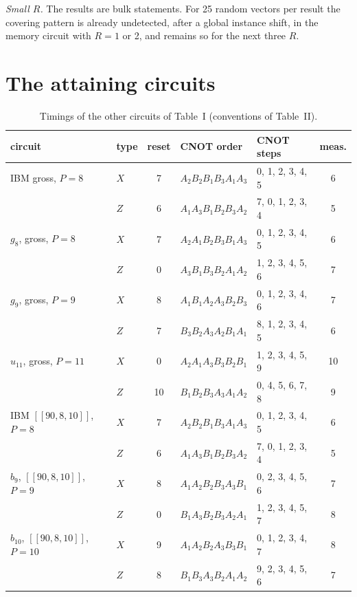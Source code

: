 \documentclass[aps,prl,twocolumn,superscriptaddress,nofootinbib]{revtex4-2}
\newcommand{\code}[1]{[[#1]]}
\begin{document}
\emph{Small $R$.} The results are bulk statements. For 25 random vectors per result the
covering pattern is already undetected, after a global instance shift, in the memory
circuit with $R=1$ or 2, and remains so for the next three $R$.

\section{The attaining circuits}\label{sm:attain}

\begin{table}[h]
\caption{Timings of the other circuits of Table~I (conventions of Table~II).}
\label{tab:timingS}
\begin{ruledtabular}
\begin{tabular}{llcllc}
circuit & type & reset & CNOT order & CNOT steps & meas.\\
\hline
IBM gross, $P=8$ & $X$ & 7 & $A_2B_2B_1B_3A_1A_3$ & 0, 1, 2, 3, 4, 5 & 6\\
 & $Z$ & 6 & $A_1A_3B_1B_2B_3A_2$ & 7, 0, 1, 2, 3, 4 & 5\\
$g_8$, gross, $P=8$ & $X$ & 7 & $A_2A_1B_2B_3B_1A_3$ & 0, 1, 2, 3, 4, 5 & 6\\
 & $Z$ & 0 & $A_3B_1B_3B_2A_1A_2$ & 1, 2, 3, 4, 5, 6 & 7\\
$g_9$, gross, $P=9$ & $X$ & 8 & $A_1B_1A_2A_3B_2B_3$ & 0, 1, 2, 3, 4, 6 & 7\\
 & $Z$ & 7 & $B_3B_2A_3A_2B_1A_1$ & 8, 1, 2, 3, 4, 5 & 6\\
$u_{11}$, gross, $P=11$ & $X$ & 0 & $A_2A_1A_3B_3B_2B_1$ & 1, 2, 3, 4, 5, 9 & 10\\
 & $Z$ & 10 & $B_1B_2B_3A_3A_1A_2$ & 0, 4, 5, 6, 7, 8 & 9\\
IBM $\code{90,8,10}$, $P=8$ & $X$ & 7 & $A_2B_2B_1B_3A_1A_3$ & 0, 1, 2, 3, 4, 5 & 6\\
 & $Z$ & 6 & $A_1A_3B_1B_2B_3A_2$ & 7, 0, 1, 2, 3, 4 & 5\\
$b_9$, $\code{90,8,10}$, $P=9$ & $X$ & 8 & $A_1A_2B_2B_3A_3B_1$ & 0, 2, 3, 4, 5, 6 & 7\\
 & $Z$ & 0 & $B_1A_3B_2B_3A_2A_1$ & 1, 2, 3, 4, 5, 7 & 8\\
$b_{10}$, $\code{90,8,10}$, $P=10$ & $X$ & 9 & $A_1A_2B_2A_3B_3B_1$ & 0, 1, 2, 3, 4, 7 & 8\\
 & $Z$ & 8 & $B_1B_3A_3B_2A_1A_2$ & 9, 2, 3, 4, 5, 6 & 7\\
\end{tabular}
\end{ruledtabular}
\end{table}
\end{document}
